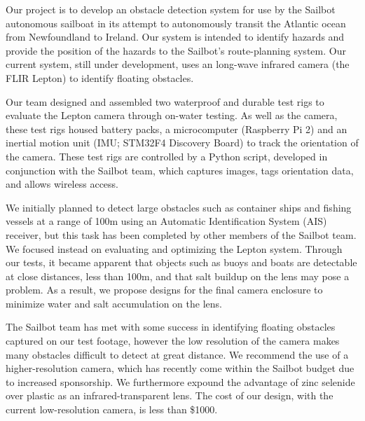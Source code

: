Our project is to develop an obstacle detection system for use by the Sailbot autonomous sailboat in its attempt to autonomously transit the Atlantic ocean from Newfoundland to Ireland. Our system is intended to identify hazards and provide the position of the hazards to the Sailbot's route-planning system. Our current system, still under development, uses an long-wave infrared camera (the FLIR Lepton) to identify floating obstacles.

Our team designed and assembled two waterproof and durable test rigs to evaluate the Lepton camera through on-water testing. As well as the camera, these test rigs housed battery packs, a microcomputer (Raspberry Pi 2) and an inertial motion unit (IMU; STM32F4 Discovery Board) to track the orientation of the camera. These test rigs are controlled by a Python script, developed in conjunction with the Sailbot team, which captures images, tags orientation data, and allows wireless access.

We initially planned to detect large obstacles such as container ships and fishing vessels at a range of 100m using an Automatic Identification System (AIS) receiver, but this task has been completed by other members of the Sailbot team. We focused instead on evaluating and optimizing the Lepton system. Through our tests, it became apparent that objects such as buoys and boats are detectable at close distances, less than 100m, and that salt buildup on the lens may pose a problem. As a result, we propose designs for the final camera enclosure to minimize water and salt accumulation on the lens.

The Sailbot team has met with some success in identifying floating obstacles captured on our test footage, however the low resolution of the camera makes many obstacles difficult to detect at great distance. We recommend the use of a higher-resolution camera, which has recently come within the Sailbot budget due to increased sponsorship. We furthermore expound the advantage of zinc selenide over plastic as an infrared-transparent lens. The cost of our design, with the current low-resolution camera, is less than \$1000.
